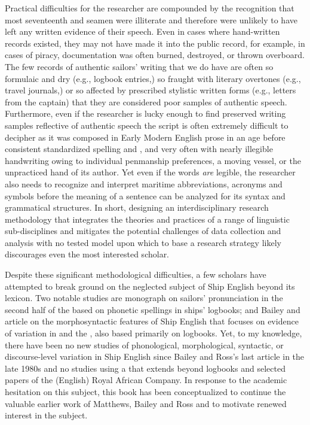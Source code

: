 Practical difficulties for the researcher are compounded by the recognition that most seventeenth and  seamen were illiterate \citep[167]{Kelly2006} and therefore were unlikely to have left any written evidence of their speech. Even in cases where hand-written records existed, they may not have made it into the public record, for example, in cases of piracy, documentation was often burned, destroyed, or thrown overboard. The few records of authentic sailors’ writing that we do have are often so formulaic and dry (e.g., logbook entries,) so fraught with literary overtones (e.g., travel journals,) or so affected by prescribed stylistic written forms (e.g., letters from the captain) that they are considered poor samples of authentic speech. Furthermore, even if the researcher is lucky enough to find preserved writing samples reflective of authentic speech the script is often extremely difficult to decipher as it was composed in Early Modern English prose in an age before consistent standardized spelling and , and very often with nearly illegible handwriting owing to individual penmanship preferences, a moving vessel, or the unpracticed hand of its author. Yet even if the words \textit{are} legible, the researcher also needs to recognize and interpret maritime abbreviations, acronyms and symbols before the meaning of a sentence can be analyzed for its syntax and grammatical structures. In short, designing an interdisciplinary research methodology that integrates the theories and practices of a range of linguistic sub-disciplines and mitigates the potential challenges of data collection and analysis with no tested model upon which to base a research strategy likely discourages even the most interested scholar. 



Despite these significant methodological difficulties, a few scholars have attempted to break ground on the neglected subject of Ship English beyond its lexicon. Two notable studies are  monograph on sailors’ pronunciation in the second half of the  based on phonetic spellings in ships’ logbooks; and Bailey and  article on the morphosyntactic features of Ship English that focuses on evidence of variation in  and the , also based primarily on logbooks. Yet, to my knowledge, there have been no new studies of phonological, morphological, syntactic, or discourse-level variation in Ship English since Bailey and Ross’s last article in the late 1980s and no studies using a  that extends beyond logbooks and selected papers of the (English) Royal African Company. In response to the academic hesitation on this subject, this book has been conceptualized to continue the valuable earlier work of Matthews, Bailey and Ross and to motivate renewed interest in the subject.  



